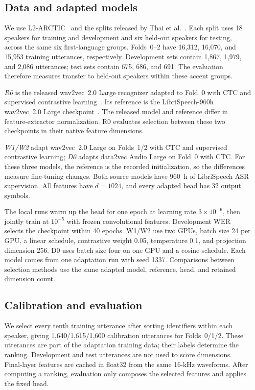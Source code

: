 \documentclass{article}
\begin{document}
\subsection{Data and adapted models}
We use L2-ARCTIC~\cite{zhao2018l2arctic} and the splits released by Thai et al.~\cite{thai2026contrastive}. Each split uses 18 speakers for training and development and six held-out speakers for testing, across the same six first-language groups. Folds~0--2 have 16,312, 16,070, and 15,953 training utterances, respectively. Development sets contain 1,867, 1,979, and 2,086 utterances; test sets contain 675, 686, and 691. The evaluation therefore measures transfer to held-out speakers within these accent groups.

\emph{R0} is the released wav2vec~2.0 Large recognizer adapted to Fold~0 with CTC and supervised contrastive learning~\cite{khosla2020supcon,thai2026contrastive}. Its reference is the LibriSpeech-960h wav2vec~2.0 Large checkpoint~\cite{panayotov2015librispeech}. The released model and reference differ in feature-extractor normalization. R0 evaluates selection between these two checkpoints in their native feature dimensions.

\emph{W1/W2} adapt wav2vec~2.0 Large on Folds~1/2 with CTC and supervised contrastive learning; \emph{D0} adapts data2vec Audio Large on Fold~0 with CTC. For these three models, the reference is the recorded initialization, so the differences measure fine-tuning changes. Both source models have 960~h of LibriSpeech ASR supervision. All features have $d=1024$, and every adapted head has 32 output symbols.

The local runs warm up the head for one epoch at learning rate $3\times10^{-6}$, then jointly train at $10^{-5}$ with frozen convolutional features. Development WER selects the checkpoint within 40 epochs. W1/W2 use two GPUs, batch size 24 per GPU, a linear schedule, contrastive weight 0.05, temperature 0.1, and projection dimension 256. D0 uses batch size four on one GPU and a cosine schedule. Each model comes from one adaptation run with seed 1337. Comparisons between selection methods use the same adapted model, reference, head, and retained dimension count.

\subsection{Calibration and evaluation}
We select every tenth training utterance after sorting identifiers within each speaker, giving 1,640/1,615/1,600 calibration utterances for Folds~0/1/2. These utterances are part of the adaptation training data; their labels determine the ranking. Development and test utterances are not used to score dimensions. Final-layer features are cached in float32 from the same 16-kHz waveforms. After computing a ranking, evaluation only composes the selected features and applies the fixed head.
\end{document}
